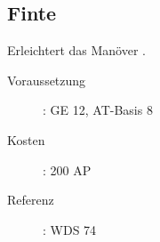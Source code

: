 \subsection{Finte}
\label{sf.finte}
Erleichtert das Manöver .
\begin{description}
    \item[Voraussetzung]:
        GE 12, AT-Basis 8
    \item [Kosten]:
        200 AP
    \item [Referenz]:
        WDS 74
\end{description}
